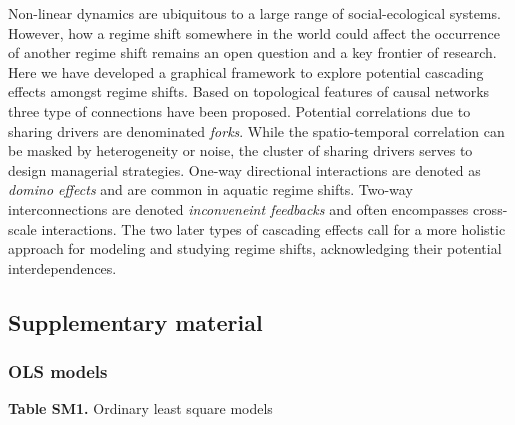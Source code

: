 \documentclass[9pt,]{article}
\begin{document}
Non-linear dynamics are ubiquitous to a large range of social-ecological
systems. However, how a regime shift somewhere in the world could affect
the occurrence of another regime shift remains an open question and a
key frontier of research. Here we have developed a graphical framework
to explore potential cascading effects amongst regime shifts. Based on
topological features of causal networks three type of connections have
been proposed. Potential correlations due to sharing drivers are
denominated \emph{forks}. While the spatio-temporal correlation can be
masked by heterogeneity or noise, the cluster of sharing drivers serves
to design managerial strategies. One-way directional interactions are
denoted as \emph{domino effects} and are common in aquatic regime
shifts. Two-way interconnections are denoted \emph{inconveneint
feedbacks} and often encompasses cross-scale interactions. The two later
types of cascading effects call for a more holistic approach for
modeling and studying regime shifts, acknowledging their potential
interdependences.

\subsection{Supplementary material}\label{supplementary-material}

\subsubsection{OLS models}\label{ols-models}

\textbf{Table SM1.} Ordinary least square models

\begingroup  \small 
\end{document}
